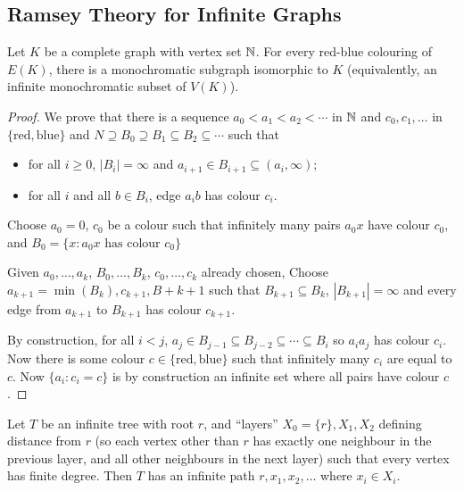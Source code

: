 \documentclass[main.tex]{subfiles}
\begin{document}
\subsection{Ramsey Theory for Infinite Graphs}
\begin{theorem}
  Let $K$ be a complete graph with vertex set $\mathbb N$.
  For every red-blue colouring of $E(K)$, there is a monochromatic subgraph
  isomorphic to $K$ (equivalently, an infinite monochromatic subset of $V(K)$).
\end{theorem}
\begin{proof}
  We prove that there is a sequence $a_0 < a_1 < a_2 < \cdots$ in $\mathbb N$ and
  $c_0,c_1,\ldots$ in $\{\text{red}, \text{blue}\}$ and
  $N\supseteq B_0\supseteq B_1\subseteq B_2\subseteq\cdots$ such that
  \begin{itemize}
    \item for all $i\geq 0$, $|B_i| = \infty$ and $a_{i+1}\in B_{i+1}\subseteq(a_i,\infty)$;
    \item for all $i$ and all $b\in B_i$, edge $a_ib$ has colour $c_i$.
  \end{itemize}
  Choose $a_0 = 0$, $c_0$ be a colour such that infinitely many pairs $a_0x$
  have colour $c_0$, and $B_0 = \{x : a_0x\text{ has colour }c_0\}$

  Given $a_0,\ldots,a_k$, $B_0,\ldots,B_k$, $c_0,\ldots,c_k$ already chosen,
  Choose $a_{k+1} = \min(B_k), c_{k+1}, B+{k+1}$ such that $B_{k+1}\subseteq B_k$,
  $|B_{k+1}| = \infty$ and every edge from $a_{k+1}$ to $B_{k+1}$ has colour $c_{k+1}$.

  By construction, for all $i < j$,
  $a_j\in B_{j-1}\subseteq B_{j-2}\subseteq\cdots\subseteq B_i$
  so $a_ia_j$ has colour $c_i$.
  Now there is some colour $c\in\{\text{red},\text{blue}\}$ such that infinitely
  many $c_i$ are equal to $c$.
  Now $\{a_i : c_i = c\}$ is by construction an infinite set where all pairs
  have colour $c$.
\end{proof}
\begin{theorem}
  Let $T$ be an infinite tree with root $r$, and ``layers''
  $X_0 = \{r\}, X_1, X_2$ defining distance from $r$ (so each vertex other than
  $r$ has exactly one neighbour in the previous layer, and all other neighbours
  in the next layer) such that every vertex has finite degree.
  Then $T$ has an infinite path $r, x_1, x_2,\ldots$ where $x_i\in X_i$.
\end{theorem}
\end{document}
